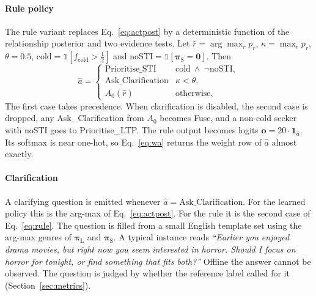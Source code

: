 \paragraph{Rule policy}
The rule variant replaces Eq.~\eqref{eq:actpost} by a deterministic function of the relationship posterior and two evidence tests. Let $\hat{r}=\arg\max_r p_r$, $\kappa=\max_r p_r$, $\theta=0.5$, $\mathrm{cold}=\mathbb{1}[f_{\mathrm{cold}}>\tfrac12]$ and $\mathrm{noSTI}=\mathbb{1}[\boldsymbol{\pi}_{\mathrm{S}}=\mathbf{0}]$. Then
\begin{equation}
  \label{eq:rule}
  \hat{a}=
  \begin{cases}
    \text{Prioritise\_STI} & \mathrm{cold}\ \wedge\ \neg\mathrm{noSTI},\\
    \text{Ask\_Clarification} & \kappa<\theta,\\
    A_0(\hat{r}) & \text{otherwise},
  \end{cases}
\end{equation}
The first case takes precedence. When clarification is disabled, the second case is dropped, any Ask\_Clarification from $A_0$ becomes Fuse, and a non-cold seeker with $\mathrm{noSTI}$ goes to Prioritise\_LTP. The rule output becomes logits $\mathbf{o}=20\cdot\mathbf{1}_{\hat{a}}$. Its softmax is near one-hot, so Eq.~\eqref{eq:wa} returns the weight row of $\hat{a}$ almost exactly.

\paragraph{Clarification}
A clarifying question is emitted whenever $\hat{a}=\text{Ask\_Clarification}$. For the learned policy this is the arg-max of Eq.~\eqref{eq:actpost}. For the rule it is the second case of Eq.~\eqref{eq:rule}. The question is filled from a small English template set using the arg-max genres of $\boldsymbol{\pi}_{\mathrm{L}}$ and $\boldsymbol{\pi}_{\mathrm{S}}$. A typical instance reads \emph{``Earlier you enjoyed drama movies, but right now you seem interested in horror. Should I focus on horror for tonight, or find something that fits both?''} Offline the answer cannot be observed. The question is judged by whether the reference label called for it (Section~\ref{sec:metrics}).

